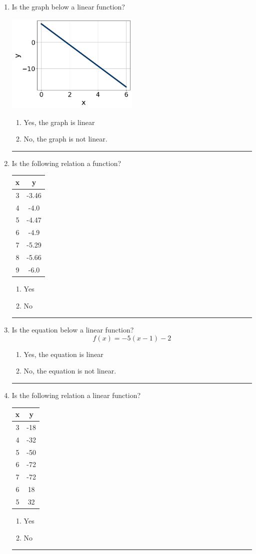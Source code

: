 \documentclass[14pt]{extbook}
\newcommand{\litem}[1]{\item#1\hspace*{-1cm}\rule{\textwidth}{0.4pt}}
\begin{document}
\begin{enumerate}
{\begin{enumerate}[label=\Alph*.]
\end{enumerate} }
\litem{
Is the graph below a linear function?
\begin{center}
    \includegraphics[width=0.5\textwidth]{../Figures/MA_8_F_1_2_graphP.png}
\end{center}
\begin{enumerate}[label=\Alph*.]
\item Yes, the graph is linear
\item No, the graph is not linear.

\end{enumerate} }
\litem{
Is the following relation a function?

\begin{tabular}{c|c}
x &y\tabularnewline \hline
3 &-3.46\tabularnewline \hline
4 &-4.0\tabularnewline \hline
5 &-4.47\tabularnewline \hline
6 &-4.9\tabularnewline \hline
7 &-5.29\tabularnewline \hline
8 &-5.66\tabularnewline \hline
9 &-6.0\end{tabular}\begin{enumerate}[label=\Alph*.]
\item Yes
\item No

\end{enumerate} }
\litem{
Is the equation below a linear function?\[ f(x) = -5(x -1)-2 \]\begin{enumerate}[label=\Alph*.]
\item Yes, the equation is linear
\item No, the equation is not linear.

\end{enumerate} }
\litem{
Is the following relation a linear function?

\begin{tabular}{c|c}
x &y\tabularnewline \hline
3 &-18\tabularnewline \hline
4 &-32\tabularnewline \hline
5 &-50\tabularnewline \hline
6 &-72\tabularnewline \hline
7 &-72\tabularnewline \hline
6 &18\tabularnewline \hline
5 &32\end{tabular}\begin{enumerate}[label=\Alph*.]
\item Yes
\item No


\end{enumerate}}
\end{enumerate}
\end{document}
